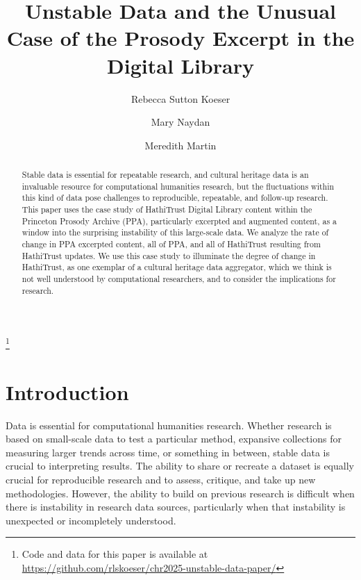 \documentclass[final]{anthology-ch} %
\title{Unstable Data and the Unusual Case of the Prosody Excerpt in the Digital Library}
\author[1]{Rebecca Sutton Koeser}[
  orcid=0000-0002-8762-8057
]
\author[1]{Mary Naydan}[
  orcid=0000-0002-7960-3175
]
\author[1]{Meredith Martin}[
  orcid=0000-0003-0214-8757
]
\affiliation{1}{Center for Digital Humanities, Princeton University, Princeton, New Jersey, USA}
\begin{document}
\maketitle 


\begin{abstract}
Stable data is essential for repeatable research, and cultural heritage data is an invaluable resource for computational humanities research, but the fluctuations within this kind of data pose challenges to reproducible, repeatable, and follow-up research. This paper uses the case study of HathiTrust Digital Library content within the Princeton Prosody Archive (PPA), particularly excerpted and augmented content, as a window into the surprising instability of this large-scale data. We analyze the rate of change in PPA excerpted content, all of PPA, and all of HathiTrust resulting from HathiTrust updates. We use this case study to illuminate the degree of change in HathiTrust, as one exemplar of a cultural heritage data aggregator, which we think is not well understood by computational researchers, and to consider the implications for research.
\end{abstract}

\renewcommand{\thefootnote}{\fnsymbol{footnote}}
\footnote{Code and data for this paper is available at \href{https://github.com/rlskoeser/chr2025-unstable-data-paper/}{https://github.com/rlskoeser/chr2025-unstable-data-paper/} }
\renewcommand{\thefootnote}{\arabic{footnote}}
\setcounter{footnote}{0}


\section{Introduction}

Data is essential for computational humanities research. Whether research is based on small-scale data to test a particular method, expansive collections for measuring larger trends across time, or something in between, stable data is crucial to interpreting results. The ability to share or recreate a dataset is equally crucial for reproducible research and to assess, critique, and take up new methodologies. However, the ability to build on previous research is difficult when there is instability in research data sources, particularly when that instability is unexpected or incompletely understood. 
\end{document}
